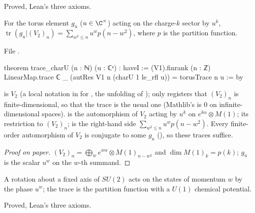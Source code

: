 \begin{status}
Proved, Lean's three axioms.
\end{status}

\begin{theorem}\label{l22:thm:toruscharacter}
For the torus element $g_u$ ($u\in\C^\times$) acting on the charge-$k$ sector by $u^k$,
$\operatorname{tr}(g_u|(V_2)_n)=\sum_{w^2\le n}u^w p(n-w^2)$, where $p$ is the partition function.
\end{theorem}
\noindent File .
\begin{leancode}
theorem trace_charU (n : ℕ) (u : ℂˣ) :
    haveI := (V1).finrank (n : ℤ)
    LinearMap.trace ℂ _ (autRes V1 n (charU 1 le_rfl u)) = torusTrace n u := by
\end{leancode}

\begin{dictionary}
 is $V_2$ (a local notation in  for
, the unfolding of ); 
only registers that $(V_2)_n$ is finite-dimensional, so that the trace is the usual one (Mathlib's
 is $0$ on infinite-dimensional spaces).  is the automorphism of $V_2$
acting by $u^k$ on $e^{k\alpha}\otimes M(1)$;  its restriction to $(V_2)_n$;
 is the right-hand side $\sum_{w^2\le n}u^wp(n-w^2)$. Every finite-order automorphism of $V_2$ is conjugate to some $g_u$
(), so these traces suffice.
\end{dictionary}

\begin{proof}[Proof on paper]
$(V_2)_n=\bigoplus_w e^{w\alpha}\otimes M(1)_{n-w^2}$ and $\dim M(1)_k=p(k)$; $g_u$ is the scalar $u^w$ on the $w$-th
summand.
\end{proof}

\begin{physics}
A rotation about a fixed axis of $SU(2)$ acts on the states of momentum $w$ by the phase $u^w$; the trace is the
partition function with a $U(1)$ chemical potential.
\end{physics}

\begin{status}
Proved, Lean's three axioms.
\end{status}

